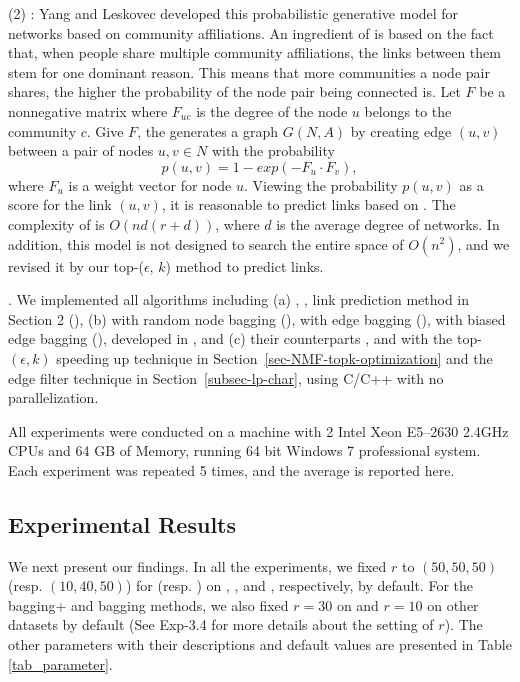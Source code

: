 \sstab  (2) \CAMBN \cite{yang-wsdm2013}:
  Yang and Leskovec developed this probabilistic generative model for networks
  based on community affiliations. An ingredient of \BIGCLAM is based on the fact that,
  when people share multiple community affiliations, the links between them stem for
  one dominant reason. This means that more communities a node pair shares,
  the higher the probability of the  node pair being connected is.
  Let $F$ be a nonnegative matrix where $F_{uc}$ is the degree of the node $u$ belongs to
  the community $c$. Give $F$, the \BIGCLAM generates a graph $G(N, A)$ by creating edge
  $(u, v)$ between a pair of nodes $u, v \in N$ with the probability
    \[ p(u, v) = 1 - exp(-F_u\cdot F_v), \]
where $F_u$ is a weight vector for node $u$. Viewing the probability $p(u, v)$ as
  a score for the link $(u, v)$, it is reasonable to predict links based on \BIGCLAM.
The complexity of  \BIGCLAM is $O(nd(r + d) )$, where $d$ is the average degree of networks.
  In addition, this model is not designed to search the entire space of $O( n^2 )$,
  and we revised it by our top-($\epsilon$, $k$) method to predict links.


.
We implemented all algorithms including (a) \Aa, \BIGCLAM,
link prediction method in Section 2 (\NMF),
(b) \NMF with random node bagging (\Node), \NMF with  edge bagging (\Edge),
\NMF with biased edge bagging (\Biased), developed in \cite{liang2016}, and (c) their counterparts \Nodep, \Edgep and \Biasedp with the top-$(\epsilon, k)$ speeding up technique in Section~\ref{sec-NMF-topk-optimization} and the edge filter technique in Section~\ref{subsec-lp-char}, using C/C++ with no parallelization.




All experiments were conducted on a machine with 2 Intel Xeon
E5--2630 2.4GHz CPUs and 64 GB of Memory, running 64 bit
Windows 7 professional system. Each experiment was repeated 5 times,
and the average is reported here.

\subsection{Experimental Results}


We next present our findings. In all the experiments, we fixed $r$ to
$(50, 50, 50)$ (resp. $(10, 40, 50)$) for \NMF (resp. \BIGCLAM) on
\Digg, \YouTube, and \Wikipedia, respectively, by default. For the bagging+ and bagging
methods, we also fixed $r = 30$ on \Digg and $r = 10$ on other datasets by default
(See Exp-3.4 for more details about the setting of $r$).
The other parameters with their descriptions and default values
are presented in Table \ref{tab_parameter}.

